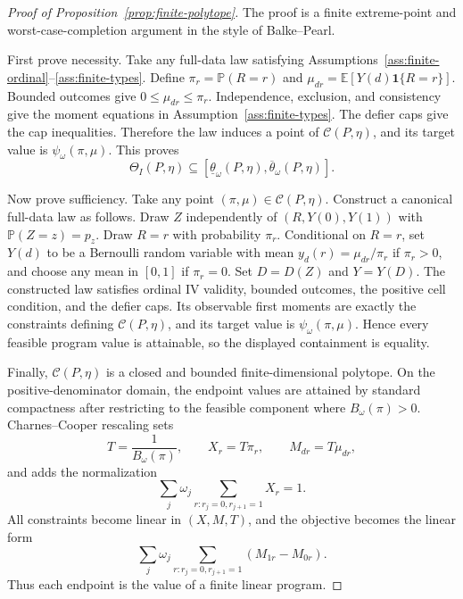 \documentclass[11pt]{article}
\newcommand{\E}{\mathbb{E}}
\renewcommand{\Pr}{\mathbb{P}}
\newcommand{\one}{\mathbf{1}}
\theoremstyle{definition}
\theoremstyle{plain}
\theoremstyle{remark}
\begin{document}
\begin{proof}[Proof of Proposition~\ref{prop:finite-polytope}]
The proof is a finite extreme-point and worst-case-completion argument in the
style of Balke--Pearl.

First prove necessity.  Take any full-data law satisfying
Assumptions~\ref{ass:finite-ordinal}--\ref{ass:finite-types}.  Define
\(\pi_r=\Pr(R=r)\) and
\(\mu_{dr}=\E[Y(d)\one\{R=r\}]\).  Bounded outcomes give
\(0\le\mu_{dr}\le\pi_r\).  Independence, exclusion, and consistency give the
moment equations in Assumption~\ref{ass:finite-types}.  The defier caps give
the cap inequalities.  Therefore the law induces a point of
\(\mathcal C(P,\eta)\), and its target value is
\(\psi_\omega(\pi,\mu)\).  This proves
\[
\Theta_I(P,\eta)
\subseteq
[\underline\theta_\omega(P,\eta),\overline\theta_\omega(P,\eta)].
\]

Now prove sufficiency.  Take any point \((\pi,\mu)\in\mathcal C(P,\eta)\).
Construct a canonical full-data law as follows.  Draw \(Z\) independently of
\((R,Y(0),Y(1))\) with \(\Pr(Z=z)=p_z\).  Draw \(R=r\) with probability
\(\pi_r\).  Conditional on \(R=r\), set \(Y(d)\) to be a Bernoulli random
variable with mean \(y_d(r)=\mu_{dr}/\pi_r\) if \(\pi_r>0\), and choose any
mean in \([0,1]\) if \(\pi_r=0\).  Set \(D=D(Z)\) and \(Y=Y(D)\).  The
constructed law satisfies ordinal IV validity, bounded outcomes, the positive
cell condition, and the defier caps.  Its observable first moments are exactly
the constraints defining \(\mathcal C(P,\eta)\), and its target value is
\(\psi_\omega(\pi,\mu)\).  Hence every feasible program value is attainable,
so the displayed containment is equality.

Finally, \(\mathcal C(P,\eta)\) is a closed and bounded finite-dimensional
polytope.  On the positive-denominator domain, the endpoint values are
attained by standard compactness after restricting to the feasible component
where \(B_\omega(\pi)>0\).  Charnes--Cooper rescaling sets
\[
T=\frac{1}{B_\omega(\pi)},\qquad
X_r=T\pi_r,\qquad
M_{dr}=T\mu_{dr},
\]
and adds the normalization
\[
\sum_j\omega_j\sum_{r:r_j=0,r_{j+1}=1}X_r=1.
\]
All constraints become linear in \((X,M,T)\), and the objective becomes the
linear form
\[
\sum_j\omega_j\sum_{r:r_j=0,r_{j+1}=1}(M_{1r}-M_{0r}).
\]
Thus each endpoint is the value of a finite linear program.
\end{proof}
\end{document}

